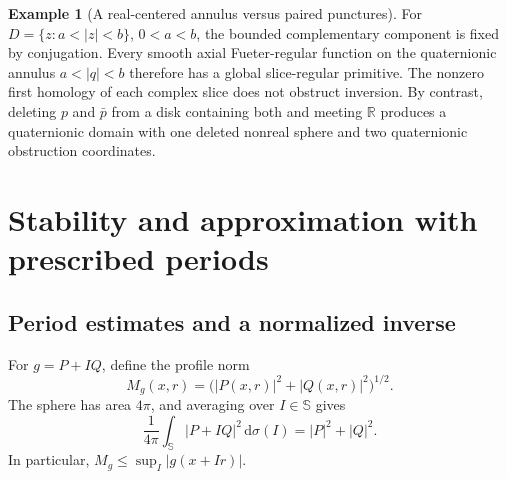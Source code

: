 \documentclass[11pt,a4paper]{article}
\numberwithin{equation}{section}
\theoremstyle{definition}
\newtheorem{example}[theorem]{Example}
\theoremstyle{remark}
\newcommand{\R}{\mathbb R}
\newcommand{\SSS}{\mathbb S}
\newcommand{\dd}{\,\mathrm d}
\begin{document}
\begin{example}[A real-centered annulus versus paired punctures]
For $D=\{z:a<|z|<b\}$, $0<a<b$, the bounded complementary component is
fixed by conjugation. Every smooth axial Fueter-regular function on the
quaternionic annulus $a<|q|<b$ therefore has a global slice-regular primitive.
The nonzero first homology of each complex slice does not obstruct inversion.
By contrast, deleting $p$ and $\bar p$ from a disk containing both and meeting
$\R$ produces a quaternionic domain with one deleted nonreal sphere and two
quaternionic obstruction coordinates.
\end{example}

\section{Stability and approximation with prescribed periods}
\label{sec:approx}

\subsection{Period estimates and a normalized inverse}
For $g=P+I Q$, define the profile norm
\[
 M_g(x,r)=\bigl(|P(x,r)|^2+|Q(x,r)|^2\bigr)^{1/2}.
\]
The sphere has area $4\pi$, and averaging over $I\in\SSS$ gives
\begin{equation}
 \frac1{4\pi}\int_{\SSS}|P+I Q|^2\dd\sigma(I)=|P|^2+|Q|^2.
 \label{eq:sphere-average}
\end{equation}
In particular, $M_g\le\sup_I|g(x+Ir)|$.
\end{document}
